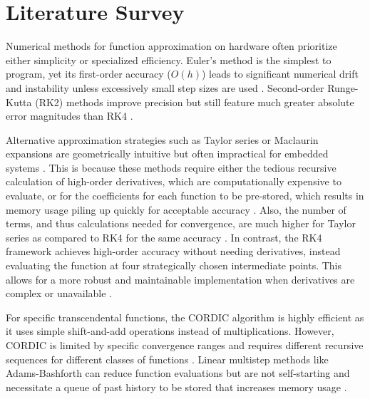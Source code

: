 \documentclass[conference]{IEEEtran}
\begin{document}
\section{Literature Survey}
Numerical methods for function approximation on hardware often prioritize either simplicity or specialized efficiency. Euler’s method 
is the simplest to program, yet its first-order accuracy ($O(h)$) leads to significant numerical drift and instability unless excessively small step sizes are used \cite{grewal2014}. Second-order Runge-Kutta (RK2) methods improve precision but still feature much greater absolute error magnitudes than RK4 \cite{ahmad2015}.

Alternative approximation strategies such as Taylor series or Maclaurin expansions are geometrically intuitive but often impractical for embedded systems \cite{Murugesan2002}.  This is because these methods require either the tedious recursive calculation of high-order derivatives, which are computationally expensive to evaluate, or for the coefficients for each function to be pre-stored, which results in memory usage piling up quickly for acceptable accuracy \cite{parker2021}. Also, the number of terms, and thus calculations needed for convergence, are much higher for Taylor series as compared to RK4 for the same accuracy \cite{Noar2024}. In contrast, the RK4 framework achieves high-order accuracy without needing derivatives, instead evaluating the function at four strategically chosen intermediate points. This allows for a more robust and maintainable implementation when derivatives are complex or unavailable \cite{Murugesan2002}.

For specific transcendental functions, the CORDIC algorithm is highly efficient as it uses simple shift-and-add operations instead of multiplications. However, CORDIC is limited by specific convergence ranges and requires different recursive sequences for different classes of functions \cite{st_cordic_an5325}. Linear multistep methods like Adams-Bashforth can reduce function evaluations but are not self-starting and necessitate a queue of past history to be stored that increases memory usage \cite{grewal2014}. 
\end{document}
